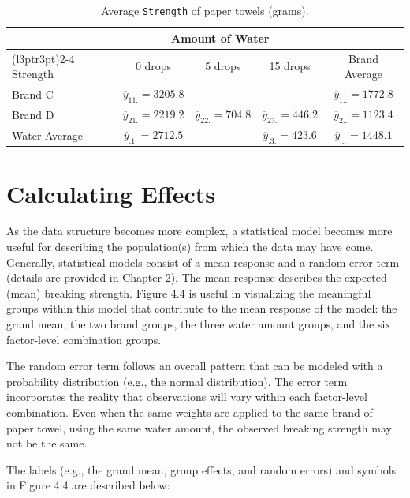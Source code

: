 \documentclass[
]{report}
\begin{document}
\begin{table}[!h]
\centering
\caption{\label{tab:tab45} Average \texttt{Strength} of paper towels (grams).}
\centering
\begin{tabular}[t]{lcccc}
\toprule
\multicolumn{1}{c}{ } & \multicolumn{3}{c}{Amount of Water} & \multicolumn{1}{c}{ } \\
\cmidrule(l{3pt}r{3pt}){2-4}
Strength & 0 drops & 5 drops & 15 drops & Brand Average\\
\midrule
Brand C & $\overline{y}_{11.} = 3205.8$ &  &  & $\overline{y}_{1..} = 1772.8$\\
Brand D & $\overline{y}_{21.} = 2219.2$ & $\overline{y}_{22.} = 704.8$ & $\overline{y}_{23.} = 446.2$ & $\overline{y}_{2..} = 1123.4$\\
Water Average & $\overline{y}_{.1.} = 2712.5$ &  & $\overline{y}_{.3.} = 423.6$ & $\overline{y}_{...} = 1448.1$\\
\bottomrule
\end{tabular}
\end{table}

\hypertarget{calculating-effects}{%
\section*{Calculating Effects}\label{calculating-effects}}

As the data structure becomes more complex, a statistical model becomes more useful for describing the population(s) from which the data may have come. Generally, statistical models consist of a mean response and a random error term (details are provided in Chapter 2). The mean response describes the expected (mean) breaking strength. Figure 4.4 is useful in visualizing the meaningful groups within this model that contribute to the mean response of the model: the grand mean, the two brand groups, the three water amount groups, and the six factor-level combination groups.

The random error term follows an overall pattern that can be modeled with a probability distribution (e.g., the normal distribution). The error term incorporates the reality that observations will vary within each factor-level combination. Even when the same weights are applied to the same brand of paper towel, using the same water amount, the observed breaking strength may not be the same.

The labels (e.g., the grand mean, group effects, and random errors) and symbols in Figure 4.4 are described below:
\end{document}
